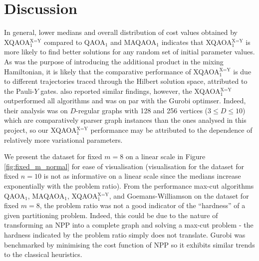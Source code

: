 \section{Discussion} \label{sec:disc}



In general, lower medians and overall distribution of cost values obtained by XQAOA$_1^\text{X=Y}$ compared to QAOA$_1$ and MAQAOA$_1$ indicates that XQAOA$_1^\text{X=Y}$ is more likely to find better solutions for any random set of initial parameter values. As was the purpose of introducing the additional product in the mixing Hamiltonian, it is likely that the comparative performance of XQAOA$_1^\text{X=Y}$ is due to different trajectories traced through the Hilbert solution space, attributed to the Pauli-$Y$ gates. \citet{vijendran2023expressive} also reported similar findings, however, the XQAOA$_1^\text{X=Y}$ outperformed all algorithms and was on par with the Gurobi optimser. Indeed, their analysis was on $D$-regular graphs with 128 and 256 vertices ($3\leq D\leq 10$) which are comparatively sparser graph instances than the ones analysed in this project, so our XQAOA$_1^\text{X=Y}$ performance may be attributed to the dependence of relatively more variational parameters.

We present the dataset for fixed $m=8$ on a linear scale in Figure \ref{fig:fixed_m_normal} for ease of visualisation (visualisation for the dataset for fixed $n=10$ is not as informative on a linear scale since the medians increase exponentially with the problem ratio). From the performance max-cut algorithms QAOA$_1$, MAQAOA$_1$, XQAOA$_1^\text{X=Y}$, and Goemans-Williamson on the dataset for fixed $m=8$, the problem ratio was not a good indicator of the ``hardness'' of a given partitioning problem. Indeed, this could be due to the nature of transforming an NPP into a complete graph and solving a max-cut problem - the hardness indicated by the problem ratio simply does not translate. Gurobi was benchmarked by minimising the cost function of NPP so it exhibits similar trends to the classical heuristics. 


